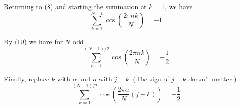 \documentclass[12pt]{article}
\begin{document}
\bigskip
Returning to (8) and starting the summation at $k=1$, we have
\begin{equation*}
\sum_{k=1}^{N-1}\cos\left(\frac{2\pi nk}{N}\right)=-1
\end{equation*}

By (10) we have for $N$ odd
\begin{equation*}
\sum_{k=1}^{(N-1)/2}\cos\left(\frac{2\pi nk}{N}\right)=-\frac{1}{2}
\end{equation*}

Finally, replace $k$ with $\alpha$ and $n$ with $j-k$.
(The sign of $j-k$ doesn't matter.)
\begin{equation*}
\sum_{\alpha=1}^{(N-1)/2}\cos\left(\frac{2\pi\alpha}{N}(j-k)\right)=-\frac{1}{2}
\end{equation*}
\end{document}
